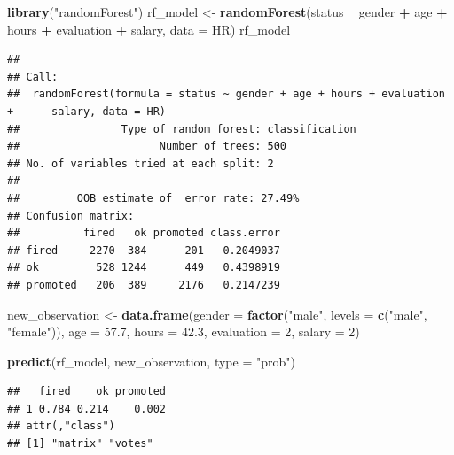 \documentclass[12pt,]{krantz}
\newenvironment{Shaded}{\begin{snugshade}}{\end{snugshade}}
\newcommand{\DataTypeTok}[1]{\textcolor[rgb]{0.13,0.29,0.53}{#1}}
\newcommand{\DecValTok}[1]{\textcolor[rgb]{0.00,0.00,0.81}{#1}}
\newcommand{\FloatTok}[1]{\textcolor[rgb]{0.00,0.00,0.81}{#1}}
\newcommand{\KeywordTok}[1]{\textcolor[rgb]{0.13,0.29,0.53}{\textbf{#1}}}
\newcommand{\NormalTok}[1]{#1}
\newcommand{\OperatorTok}[1]{\textcolor[rgb]{0.81,0.36,0.00}{\textbf{#1}}}
\newcommand{\StringTok}[1]{\textcolor[rgb]{0.31,0.60,0.02}{#1}}
\theoremstyle{definition}
\theoremstyle{definition}
\theoremstyle{definition}
\theoremstyle{remark}
\begin{document}
\begin{Shaded}
\begin{Highlighting}[]
\KeywordTok{library}\NormalTok{(}\StringTok{"randomForest"}\NormalTok{)}
\NormalTok{rf_model <-}\StringTok{ }\KeywordTok{randomForest}\NormalTok{(status }\OperatorTok{~}\StringTok{ }\NormalTok{gender }\OperatorTok{+}\StringTok{ }\NormalTok{age }\OperatorTok{+}\StringTok{ }\NormalTok{hours }\OperatorTok{+}\StringTok{ }\NormalTok{evaluation }\OperatorTok{+}\StringTok{ }\NormalTok{salary, }\DataTypeTok{data =}\NormalTok{ HR)}
\NormalTok{rf_model}
\end{Highlighting}
\end{Shaded}

\begin{verbatim}
## 
## Call:
##  randomForest(formula = status ~ gender + age + hours + evaluation +      salary, data = HR) 
##                Type of random forest: classification
##                      Number of trees: 500
## No. of variables tried at each split: 2
## 
##         OOB estimate of  error rate: 27.49%
## Confusion matrix:
##          fired   ok promoted class.error
## fired     2270  384      201   0.2049037
## ok         528 1244      449   0.4398919
## promoted   206  389     2176   0.2147239
\end{verbatim}

\begin{Shaded}
\begin{Highlighting}[]
\NormalTok{new_observation <-}\StringTok{ }\KeywordTok{data.frame}\NormalTok{(}\DataTypeTok{gender =} \KeywordTok{factor}\NormalTok{(}\StringTok{"male"}\NormalTok{, }\DataTypeTok{levels =} \KeywordTok{c}\NormalTok{(}\StringTok{"male"}\NormalTok{, }\StringTok{"female"}\NormalTok{)),}
                      \DataTypeTok{age =} \FloatTok{57.7}\NormalTok{,}
                      \DataTypeTok{hours =} \FloatTok{42.3}\NormalTok{,}
                      \DataTypeTok{evaluation =} \DecValTok{2}\NormalTok{,}
                      \DataTypeTok{salary =} \DecValTok{2}\NormalTok{)}

\KeywordTok{predict}\NormalTok{(rf_model, new_observation, }\DataTypeTok{type =} \StringTok{"prob"}\NormalTok{)}
\end{Highlighting}
\end{Shaded}

\begin{verbatim}
##   fired    ok promoted
## 1 0.784 0.214    0.002
## attr(,"class")
## [1] "matrix" "votes"
\end{verbatim}
\end{document}
